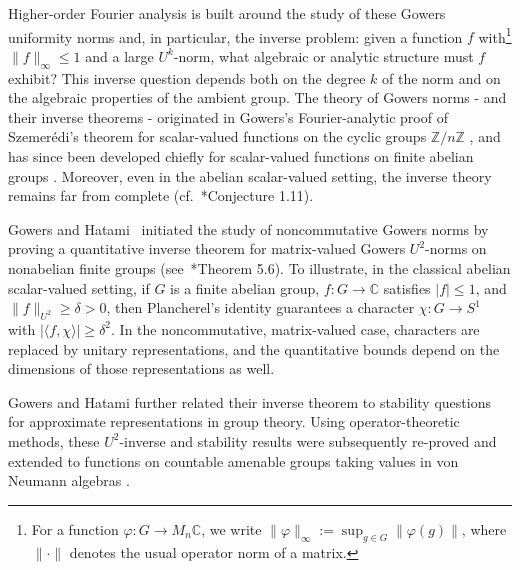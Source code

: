 \documentclass[a4paper,11pt]{amsproc}
\theoremstyle{plain}
\theoremstyle{definition}
\begin{document}
Higher-order Fourier analysis is built around the study of these Gowers uniformity norms and, in particular, the inverse problem: given a function $f$ with\footnote{For a function $\varphi \colon G \to M_n \mathbb{C}$, we write $\|\varphi\|_{\infty} := \sup_{g \in G} \|\varphi(g)\|$, where $\|\cdot\|$ denotes the usual operator norm of a matrix.} $\|f\|_\infty\le1$ and a large $U^k$-norm, what algebraic or analytic structure must $f$ exhibit?  This inverse question depends both on the degree $k$ of the norm and on the algebraic properties of the ambient group.  The theory of Gowers norms - and their inverse theorems - originated in Gowers’s Fourier-analytic proof of Szemerédi’s theorem for scalar-valued functions on the cyclic groups $\mathbb{Z}/n\mathbb{Z}$ \cite{g1}, and has since been developed chiefly for scalar-valued functions on finite abelian groups \cites{gtz,jt,leng,luka,tz1,tz2}.  Moreover, even in the abelian scalar-valued setting, the inverse theory remains far from complete (cf.\ \cite{jt}*{Conjecture 1.11}).

Gowers and Hatami~\cite{MR3733361} initiated the study of noncommutative Gowers norms by proving a quantitative inverse theorem for matrix-valued Gowers $U^2$-norms on nonabelian finite groups (see~\cite{MR3733361}*{Theorem 5.6}).  To illustrate, in the classical abelian scalar-valued setting, if $G$ is a finite abelian group, $f\colon G\to\mathbb{C}$ satisfies $\lvert f\rvert\le1$, and $\|f\|_{U^2}\ge\delta>0$, then Plancherel’s identity guarantees a character $\chi\colon G\to S^1$ with $|\langle f,\chi\rangle|\ge\delta^2$. In the noncommutative, matrix-valued case, characters are replaced by unitary representations, and the quantitative bounds depend on the dimensions of those representations as well.  

Gowers and Hatami further related their inverse theorem to stability questions for approximate representations in group theory.  Using operator-theoretic methods, these $U^2$-inverse and stability results were subsequently re-proved and extended to functions on countable amenable groups taking values in von Neumann algebras \cite{MR3867328}.
\end{document}
